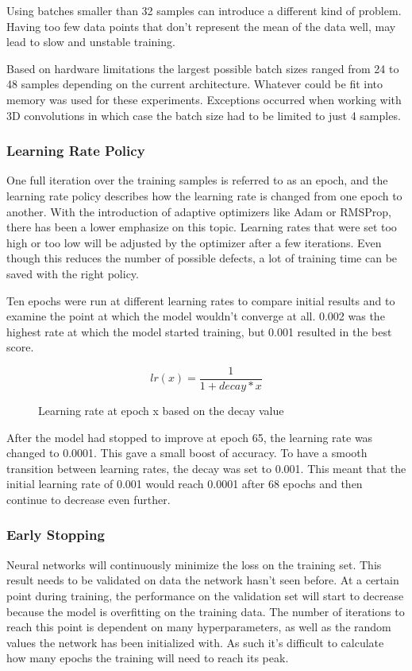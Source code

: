 Using batches smaller than 32 samples can introduce a different kind of problem. Having too few data points that don't represent the mean of the data well, may lead to slow and unstable training.

Based on hardware limitations the largest possible batch sizes ranged from 24 to 48 samples depending on the current architecture. Whatever could be fit into memory was used for these experiments. Exceptions occurred when working with 3D convolutions in which case the batch size had to be limited to just 4 samples.

\subsubsection{Learning Rate Policy}

One full iteration over the training samples is referred to as an epoch, and the learning rate policy describes how the learning rate is changed from one epoch to another. With the introduction of adaptive optimizers like Adam or RMSProp, there has been a lower emphasize on this topic. Learning rates that were set too high or too low will be adjusted by the optimizer after a few iterations. Even though this reduces the number of possible defects, a lot of training time can be saved with the right policy.

Ten epochs were run at different learning rates to compare initial results and to examine the point at which the model wouldn't converge at all. 0.002 was the highest rate at which the model started training, but 0.001 resulted in the best score.

\begin{figure}[H]
\[
lr(x) = \frac{1}{1 + decay * x}
\]
\caption{Learning rate at epoch x based on the decay value}
\end{figure}

After the model had stopped to improve at epoch 65, the learning rate was changed to 0.0001. This gave a small boost of accuracy. To have a smooth transition between learning rates, the decay was set to 0.001. This meant that the initial learning rate of 0.001 would reach 0.0001 after 68 epochs and then continue to decrease even further.

\subsubsection{Early Stopping}

Neural networks will continuously minimize the loss on the training set. This result needs to be validated on data the network hasn't seen before. At a certain point during training, the performance on the validation set will start to decrease because the model is overfitting on the training data. The number of iterations to reach this point is dependent on many hyperparameters, as well as the random values the network has been initialized with. As such it's difficult to calculate how many epochs the training will need to reach its peak.

